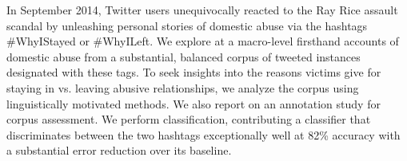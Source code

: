 In September 2014, Twitter users unequivocally reacted to the Ray Rice assault scandal by unleashing personal stories of domestic abuse via the hashtags \#WhyIStayed or \#WhyILeft. We explore at a macro-level firsthand accounts of domestic abuse from a substantial, balanced corpus of tweeted instances designated with these tags. To seek insights into the reasons victims give for staying in vs. leaving abusive relationships, we analyze the corpus using linguistically motivated methods. We also report on an annotation study for corpus assessment. We perform classification, contributing a classifier that discriminates between the two hashtags exceptionally well at 82\% accuracy with a substantial error reduction over its baseline.

